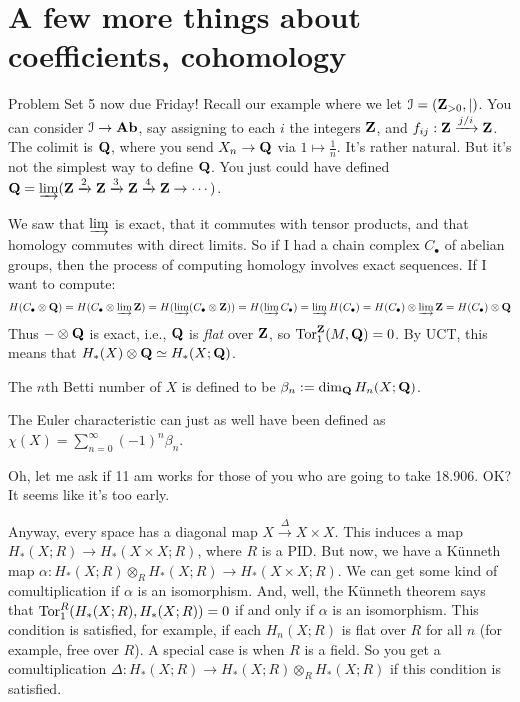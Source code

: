 \section{A few more things about coefficients, cohomology}
Problem Set 5 now due Friday! Recall our example where we let $\mathcal I=(\mathbf Z_{>0},|)$. You can consider $\mathcal I\to\mathbf{Ab}$, say assigning to each $i$ the integers $\mathbf Z$, and $f_{ij}:\mathbf Z\xrightarrow{j/i}\mathbf Z$. The colimit is $\mathbf Q$, where you send $X_n\to\mathbf Q$ via $1\mapsto \frac{1}{n}$. It's rather natural. But it's not the simplest way to define $\mathbf Q$. You just could have defined $\mathbf Q=\varinjlim(\mathbf Z\xrightarrow{2}\mathbf Z\xrightarrow{3}\mathbf Z\xrightarrow{4}\mathbf Z\to\cdots)$.

We saw that $\varinjlim$ is exact, that it commutes with tensor products, and that homology commutes with direct limits. So if I had a chain complex $C_\bullet$ of abelian groups, then the process of computing homology involves exact sequences. If I want to compute:
\begin{equation*}
 H(C_\bullet\otimes\mathbf Q)= H(C_\bullet\otimes\varinjlim \mathbf Z)= H(\varinjlim(C_\bullet\otimes\mathbf Z))= H(\varinjlim C_\bullet)=\varinjlim H(C_\bullet)= H(C_\bullet)\otimes\varinjlim \mathbf Z= H(C_\bullet)\otimes\mathbf Q
\end{equation*}
Thus $-\otimes\mathbf Q$ is exact, i.e., $\mathbf Q$ is \emph{flat} over $\mathbf Z$, so $\operatorname{Tor}^\mathbf Z_1(M,\mathbf Q)=0$. By UCT, this means that $ H_\ast(X)\otimes \mathbf Q\simeq H_\ast(X;\mathbf Q)$.
\begin{definition}
The $n$th Betti number of $X$ is defined to be $\beta_n:=\dim_\mathbf Q H_n(X;\mathbf Q)$.
\end{definition}
The Euler characteristic can just as well have been defined as $\chi(X)=\sum^\infty_{n=0}(-1)^n\beta_n$.

Oh, let me ask if 11 am works for those of you who are going to take 18.906. OK? It seems like it's too early.

Anyway, every space has a diagonal map $X\xrightarrow{\Delta}X\times X$. This induces a map $ H_\ast(X;R)\to H_\ast(X\times X;R)$, where $R$ is a PID. But now, we have a K\"{u}nneth map $\alpha: H_\ast(X;R)\otimes_R H_\ast(X;R)\to H_\ast(X\times X;R)$. We can get some kind of comultiplication if $\alpha$ is an isomorphism. And, well, the K\"{u}nneth theorem says that $\operatorname{Tor}^R_1( H_\ast(X;R), H_\ast(X;R))=0$ if and only if $\alpha$ is an isomorphism. This condition is satisfied, for example, if each $ H_n(X;R)$ is flat over $R$ for all $n$ (for example, free over $R$). A special case is when $R$ is a field. So you get a comultiplication $\Delta: H_\ast(X;R)\to H_\ast(X;R)\otimes_R H_\ast(X;R)$ if this condition is satisfied.

